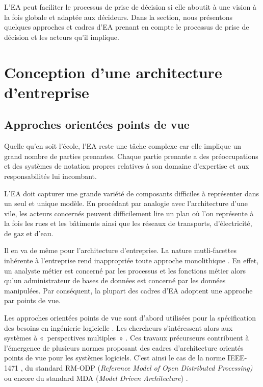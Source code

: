 L'EA peut faciliter le processus de prise de décision si elle aboutit à une
vision à la fois globale et adaptée aux décideurs. Dans la section, nous
présentons quelques approches et cadres d'EA prenant en compte le processus de
prise de décision et les acteurs qu'il implique.

\section{Conception d'une architecture d'entreprise}

\subsection{Approches orientées points de vue}

Quelle qu'en soit l'école, l'EA reste une tâche complexe
\cite{steen2004supporting} car elle implique un grand nombre de parties
prenantes. Chaque partie prenante a des préoccupations et des systèmes de
notation propres relatives à son domaine d'expertise et aux responsabilités lui
incombant.

L'EA doit capturer une grande variété de composants difficiles à représenter
dans un seul et unique modèle. En procédant par analogie avec l'architecture
d'une vile, les acteurs concernés peuvent difficilement lire un plan où l'on
représente à la fois les rues et les bâtiments ainsi que les réseaux de
transports, d'électricité, de gaz et d'eau. 

Il en va de même pour l'architecture d'entreprise. La nature mutli-facettes
inhérente à l'entreprise rend inappropriée toute approche monolithique
\cite{armour1999bigpicture}. En effet, un analyste métier est concerné par les
processus et les fonctions métier alors qu'un administrateur de bases de
données est concerné par les données manipulées. Par conséquent, la plupart des
cadres d'EA adoptent une approche par points de vue.

Les approches orientées points de vue sont d'abord utilisées pour la
spécification des besoins en ingénierie logicielle \cite{mullery1979core}. Les
chercheurs s'intéressent alors aux systèmes à «~perspectives multiples~»
\cite{finkelstein1992viewpoints} \cite{kotonya1996requirements}
\cite{nuseibeh1994multi} \cite{meyers1993representing}. Ces travaux précurseurs
contribuent à l'émergence de plusieurs normes proposant des cadres
d'architecture orientés points de vue pour les systèmes logiciels. C'est ainsi
le cas de la norme IEEE-1471 \cite{hilliard2000ieee}, du standard RM-ODP
(\textit{Reference Model of Open Distributed Processing)}
\cite{raymond1995reference} ou encore du standard MDA (\textit{Model Driven
Architecture}) \cite{kleppe2003mda}.

